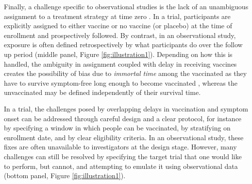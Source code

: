\documentclass[11pt]{article}
\begin{document}
Finally, a challenge specific to observational studies is the lack of an unambiguous assignment to a treatment strategy at time zero \cite{hernan_how_2018}. In a trial, participants are explicitly assigned to either vaccine or no vaccine (or placebo) at the time of enrollment and prospectively followed. By contrast, in an observational study, exposure is often defined retrospectively by what participants do over the follow up period (middle panel, Figure \ref{fig:illustration1}). Depending on how this is handled, the ambiguity in assignment coupled with delay in receiving vaccines creates the possibility of bias due to \textit{immortal time} among the vaccinated as they have to survive symptom-free long enough to become vaccinated \cite{suissa_immortal_2008}, whereas the unvaccinated may be defined independently of their survival time.

In a trial, the challenges posed by overlapping delays in vaccination and symptom onset can be addressed through careful design and a clear protocol, for instance by specifying a  window in which people can be vaccinated, by stratifying on enrollment date, and by clear eligibility criteria. In an observational study, these fixes are often unavailable to investigators at the design stage. However, many challenges can still be resolved by specifying the target trial that one would like to perform, but cannot, and attempting to emulate it using observational data (bottom panel, Figure \ref{fig:illustration1}).
\end{document}

